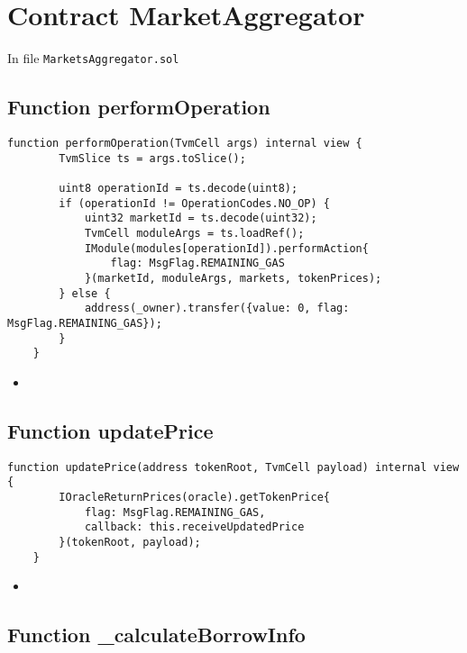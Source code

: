 
\section{Contract MarketAggregator}

In file {\tt MarketsAggregator.sol}

\subsection{Function performOperation}

\begin{lstlisting}[firstnumber=361]
    function performOperation(TvmCell args) internal view {
        TvmSlice ts = args.toSlice();

        uint8 operationId = ts.decode(uint8);
        if (operationId != OperationCodes.NO_OP) {
            uint32 marketId = ts.decode(uint32);
            TvmCell moduleArgs = ts.loadRef();
            IModule(modules[operationId]).performAction{
                flag: MsgFlag.REMAINING_GAS
            }(marketId, moduleArgs, markets, tokenPrices);
        } else {
            address(_owner).transfer({value: 0, flag: MsgFlag.REMAINING_GAS});
        }
    }
\end{lstlisting}

\noindent\begin{itemize}
  \item {}
\end{itemize}


\subsection{Function updatePrice}

\begin{lstlisting}[firstnumber=428]
    function updatePrice(address tokenRoot, TvmCell payload) internal view {
        IOracleReturnPrices(oracle).getTokenPrice{
            flag: MsgFlag.REMAINING_GAS,
            callback: this.receiveUpdatedPrice
        }(tokenRoot, payload);
    }
\end{lstlisting}

\noindent\begin{itemize}
  \item {}
\end{itemize}
  
  
\subsection{Function \_{}calculateBorrowInfo}

